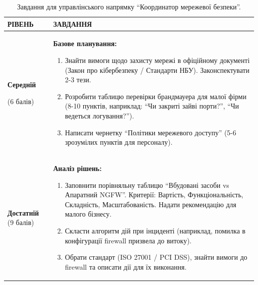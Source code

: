 \begin{table}[h!]
\caption{Завдання для управлінського напрямку ``Координатор мережевої безпеки''.}
\label{tab:lab3_manag_task} %
\noindent %

\begin{tabular}{
  | >{\raggedright\arraybackslash}p{} 
  | >{\raggedright\arraybackslash}p{} |
}
\hline

\rowcolor{TableHeaderBrown}
\hfil \color{white}\textbf{РІВЕНЬ} & 
\hfil \color{white}\textbf{ЗАВДАННЯ} \\ \hline

\cellcolor{TableBodyPeach}
\small \textbf{Середній} 

(6 балів) &
\small \textbf{Базове планування:}
    \begin{enumerate}
        \item Знайти вимоги щодо захисту мережі в офіційному документі (Закон про кібербезпеку / Стандарти НБУ). Законспектувати 2-3 тези.
        \item Розробити таблицю перевірки брандмауера для малої фірми (8-10 пунктів, наприклад: ``Чи закриті зайві порти?'', ``Чи ведеться логування?'').
        \item Написати чернетку ``Політики мережевого доступу'' (5-6 зрозумілих пунктів для персоналу).
    \end{enumerate}
 \\ \hline

\cellcolor{TableBodyPeach}
\small \textbf{Достатній} (9 балів) &
\small \textbf{Аналіз рішень:}
\begin{enumerate}
    \item Заповнити порівняльну таблицю ``Вбудовані засоби vs Апаратний NGFW''. Критерії: Вартість, Функціональність, Складність, Масштабованість. Надати рекомендацію для малого бізнесу.
    \item Скласти алгоритм дій при інциденті (наприклад, помилка в конфігурації firewall призвела до витоку).
    \item Обрати стандарт (ISO 27001 / PCI DSS), знайти вимоги до firewall та описати дії для їх виконання.
\end{enumerate} \\ \hline


\end{tabular}
\end{table}
